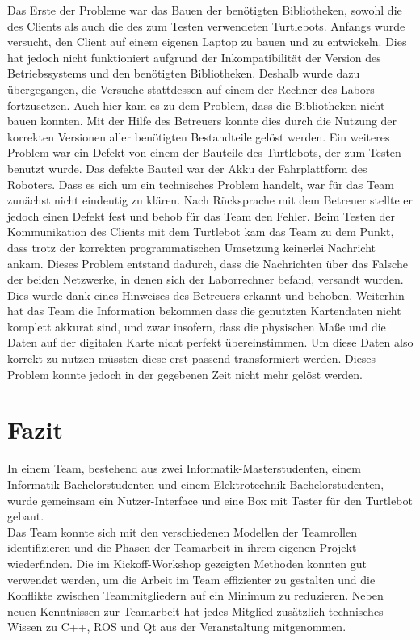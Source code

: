 \documentclass[a4paper,12pt,headsepline]{scrartcl}
\begin{document}
Das Erste der Probleme war das Bauen der benötigten Bibliotheken, sowohl die des Clients als auch die des zum Testen verwendeten Turtlebots. Anfangs wurde versucht, den Client auf einem eigenen Laptop zu bauen und zu entwickeln. Dies hat jedoch nicht funktioniert aufgrund der Inkompatibilität der Version des Betriebssystems und den benötigten Bibliotheken. Deshalb wurde dazu übergegangen, die Versuche stattdessen auf einem der Rechner des Labors fortzusetzen. Auch hier kam es zu dem Problem, dass die Bibliotheken nicht bauen konnten. Mit der Hilfe des Betreuers konnte dies durch die Nutzung der korrekten Versionen aller benötigten Bestandteile gelöst werden. Ein weiteres Problem war ein Defekt von einem der Bauteile des Turtlebots, der zum Testen benutzt wurde. Das defekte Bauteil war der Akku der Fahrplattform des Roboters. Dass es sich um ein technisches Problem handelt, war für das Team zunächst nicht eindeutig zu klären. Nach Rücksprache mit dem Betreuer stellte er jedoch einen Defekt fest und behob für das Team den Fehler. Beim Testen der Kommunikation des Clients mit dem Turtlebot kam das Team zu dem Punkt, dass trotz der korrekten programmatischen Umsetzung keinerlei Nachricht ankam. Dieses Problem entstand dadurch, dass die Nachrichten über das Falsche der beiden Netzwerke, in denen sich der Laborrechner befand, versandt wurden. Dies wurde dank eines Hinweises des Betreuers erkannt und behoben.
Weiterhin hat das Team die Information bekommen dass die genutzten Kartendaten nicht komplett akkurat sind, und zwar insofern, dass die physischen Maße und die Daten auf der digitalen Karte nicht perfekt übereinstimmen. Um diese Daten also korrekt zu nutzen müssten diese erst passend transformiert werden. Dieses Problem konnte jedoch in der gegebenen Zeit nicht mehr gelöst werden.

\newpage
	\section{Fazit}
		In einem Team, bestehend aus zwei Informatik-Masterstudenten, einem Informatik-Bachelorstudenten und einem Elektrotechnik-Bachelorstudenten, wurde gemeinsam ein Nutzer-Interface und eine Box mit Taster für den Turtlebot gebaut.\\
		Das Team konnte sich mit den verschiedenen Modellen der Teamrollen identifizieren und die Phasen der Teamarbeit in ihrem eigenen Projekt wiederfinden. Die im Kickoff-Workshop gezeigten Methoden konnten gut verwendet werden, um die Arbeit im Team effizienter zu gestalten und die Konflikte zwischen Teammitgliedern auf ein Minimum zu reduzieren. Neben neuen Kenntnissen zur Teamarbeit hat jedes Mitglied zusätzlich technisches Wissen zu C++, ROS und Qt aus der Veranstaltung mitgenommen.
		
\end{document}
